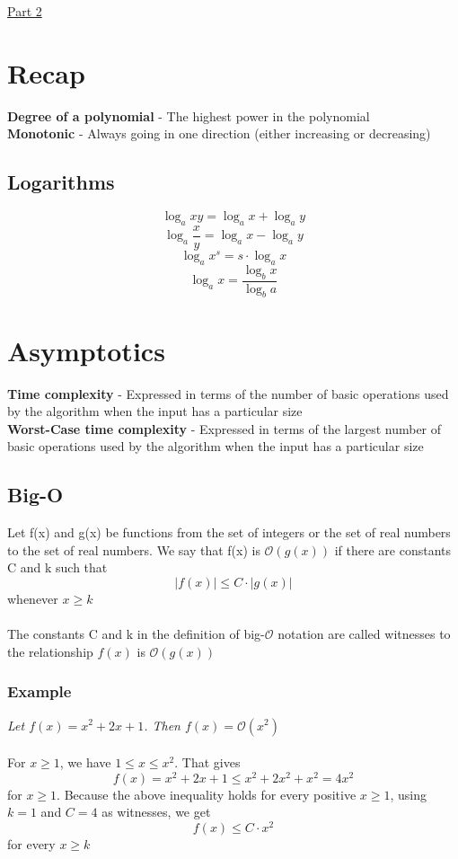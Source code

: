 \documentclass{article}[18pt]
\begin{document}
\begin{center}
\underline{\huge Part 2}
\end{center}
\section{Recap}
\textbf{Degree of a polynomial} - The highest power in the polynomial\\
\textbf{Monotonic} - Always going in one direction (either increasing or decreasing)
\subsection{Logarithms}
\[
\log _{a} x y=\log _{a} x+\log _{a} y
\]
\[
\log _{a} \frac{x}{y}=\log _{a} x-\log _{a} y
\]
\[
\log _{a} x^{s}=s \cdot \log _{a} x
\]
\[
\log _{a} x=\frac{\log _{b} x}{\log _{b} a}
\]
\section{Asymptotics}
\textbf{Time complexity} - Expressed in terms of the number of basic operations used by the algorithm when the input has a particular size\\
\textbf{Worst-Case time complexity} - Expressed in terms of the largest number of basic operations used by the algorithm when the input has a particular size
\subsection{Big-O}
Let f(x) and g(x) be functions from the set of integers or the set of real numbers to the set of real numbers. We say that f(x) is $\mathcal{O}(g(x))$ if there are constants C and k such that
\[
|f(x)| \leq C \cdot|g(x)|
\]
whenever $x\geqslant k$\\
\\
The constants C and k in the definition of big-$\mathcal{O}$ notation are called witnesses to the relationship $f(x)$ is $\mathcal{O}(g(x))$
\subsubsection{Example}
\textit{Let $f(x)=x^2+2x+1$. Then $f(x)=\mathcal{O}(x^2)$}\\
\\
For $x\geqslant 1$, we have $1\leqslant x \leqslant x^2$. That gives
\[
f(x)=x^{2}+2 x+1 \leq x^{2}+2 x^{2}+x^{2}=4 x^{2}
\]
for $x\geqslant 1$. Because the above inequality holds for every positive $x\geqslant 1$, using $k=1$ and $C=4$ as witnesses, we get
\[
f(x) \leq C \cdot x^{2}
\]
for every $x\geqslant k$
\end{document}
